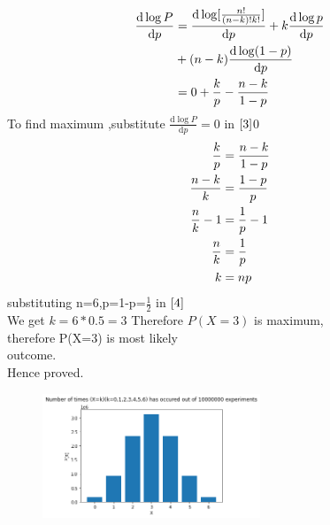 \documentclass{assignment}
\begin{document}
\begin{multicols}{2}
\begin{align}
\frac{\mathrm{d} \log P}{\mathrm{d} p}&=\frac{\mathrm{d} \log[\frac{n!}{(n-k)!k!}]}{\mathrm{d}p}+k \frac{\mathrm{d}\log p}{\mathrm{d} p} \notag \\
     &+(n-k) \frac{\mathrm{d}\log (1-p)}{\mathrm{d} p} \notag \\
     &=0+\frac{k}{p}-\frac{n-k}{1-p} \label{3}
\end{align}
To find maximum ,substitute $\frac{\mathrm{d} \log P}{\mathrm{d} p}=0$ in $\eqref{3}$0
\begin{align}
\frac{k}{p}&=\frac{n-k}{1-p} \notag \\
\frac{n-k}{k}&=\frac{1-p}{p} \notag \\
\frac{n}{k}-1&=\frac{1}{p}-1 \notag \\
\frac{n}{k}&=\frac{1}{p} \notag \\
k&=np \label{4}
\end{align}
substituting n=6,p=1-p=$\frac{1}{2}$ in $\eqref{4}$\\
We get $k=6*0.5=3$
Therefore $P(X=3)$ is maximum,\\
therefore P(X=3) is most likely \\
outcome.\\
Hence proved.
\end{multicols}
\begin{figure}
\begin{center}
\includegraphics[width=0.58\textwidth]{assignment1.png}
\end{center}
\end{figure}
\end{document}
